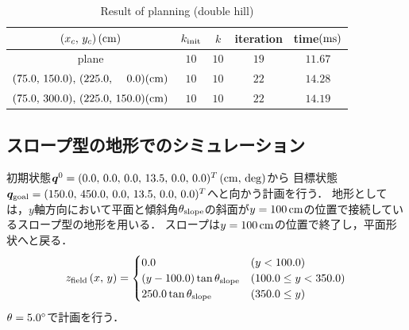 \documentclass[autodetect-engine,dvipdfmx-if-dvi,ja=standard,a4j,jbase=11pt,magstyle=nomag*]{bxjsreport}
\begin{document}
\begin{table}[t]%
    \caption{Result of planning (double hill)}%
    \label{tab:sim_hrp2_hill2}%
    \centering%
    \begin{tabular}{ccccc}%
        \toprule%
        $(x_c ,\, y_c)\,(\si{\centi\meter})$                                      &   $k_{\mathrm{init}}$ &   $k$     &   iteration   &   time$(\si{\milli\second})$ \\%
        \midrule%
        plane                                                       &   $10$        &   $10$    &   $19$        &   $11.67$ \\%
        $(75.0 ,\, 150.0) ,\, (225.0 ,\, \phantom{00}0.0) (\si{\centi\meter})$    &   $10$        &   $10$    &   $22$        &   $14.28$ \\%
        $(75.0 ,\, 300.0) ,\, (225.0 ,\, 150.0) (\si{\centi\meter})$              &   $10$        &   $10$    &   $22$        &   $14.19$ \\%
        \bottomrule%
    \end{tabular}%
\end{table}

\subsection{スロープ型の地形でのシミュレーション}
\label{subsec:sim_hrp2_lope}
初期状態$\bm{q}^0 = ( 0.0 ,\, 0.0 ,\, 0.0 ,\, 13.5 ,\, 0.0 ,\, 0.0 )^T\,(\si{\centi\meter} ,\, \mathrm{deg})$から
目標状態$\bm{q}_{\mathrm{goal}} = ( 150.0 ,\, 450.0 ,\, 0.0 ,\, 13.5 ,\, 0.0 ,\, 0.0 )^T$へと向かう計画を行う．
地形としては，$y$軸方向において平面と傾斜角$\theta_{\mathrm{slope}}$の斜面が$y = 100\,\si{\centi\meter}$の位置で接続しているスロープ型の地形を用いる．
スロープは$y = 100\,\si{\centi\meter}$の位置で終了し，平面形状へと戻る．
\begin{equation}
    z_{\mathrm{field}}\left( x ,\, y \right) =
        \begin{cases}
            0.0                                           & \left( y < 100.0 \right) \\
            \left( y - 100.0 \right) \tan \theta_{\mathrm{slope}} & \left( 100.0 \leq y < 350.0 \right) \\
            250.0 \tan \theta_{\mathrm{slope}}                    & \left( 350.0 \leq y \right)
        \end{cases}
\end{equation}
$\theta = 5.0\degree$で計画を行う．
\end{document}
